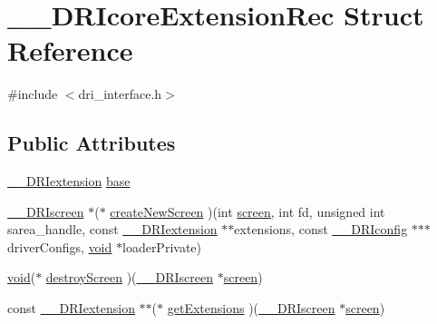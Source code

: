 \hypertarget{struct_____d_r_icore_extension_rec}{}\section{\+\_\+\+\_\+\+D\+R\+Icore\+Extension\+Rec Struct Reference}
\label{struct_____d_r_icore_extension_rec}


{\ttfamily \#include $<$dri\+\_\+interface.\+h$>$}

\subsection*{Public Attributes}
\begin{DoxyCompactItemize}
\item 
\hyperlink{dri__interface_8h_a4e0a61c8ece00d2b2c6792a9a1b55385}{\+\_\+\+\_\+\+D\+R\+Iextension} \hyperlink{struct_____d_r_icore_extension_rec_a5f960f7c4747dbda8574a66c246f2cc0}{base}
\item 
\hyperlink{dri__interface_8h_a9961b01d421ee1fd6ed3c05acc9ca561}{\+\_\+\+\_\+\+D\+R\+Iscreen} $\ast$($\ast$ \hyperlink{struct_____d_r_icore_extension_rec_ac1f7443c2b0244968dffeb347ee32fcb}{create\+New\+Screen} )(int \hyperlink{cad_8h_ae04e09e4e3831bfc1632c509ae37dcec}{screen}, int fd, unsigned int sarea\+\_\+handle, const \hyperlink{dri__interface_8h_a4e0a61c8ece00d2b2c6792a9a1b55385}{\+\_\+\+\_\+\+D\+R\+Iextension} $\ast$$\ast$extensions, const \hyperlink{dri__interface_8h_aeac81999efbbf8b1d6886338e3ea24d9}{\+\_\+\+\_\+\+D\+R\+Iconfig} $\ast$$\ast$$\ast$driver\+Configs, \hyperlink{_s_d_l__opengles2__gl2ext_8h_ae5d8fa23ad07c48bb609509eae494c95}{void} $\ast$loader\+Private)
\item 
\hyperlink{_s_d_l__opengles2__gl2ext_8h_ae5d8fa23ad07c48bb609509eae494c95}{void}($\ast$ \hyperlink{struct_____d_r_icore_extension_rec_adcd287b6c4009b4d8e01bac36fb0f09b}{destroy\+Screen} )(\hyperlink{dri__interface_8h_a9961b01d421ee1fd6ed3c05acc9ca561}{\+\_\+\+\_\+\+D\+R\+Iscreen} $\ast$\hyperlink{cad_8h_ae04e09e4e3831bfc1632c509ae37dcec}{screen})
\item 
const \hyperlink{dri__interface_8h_a4e0a61c8ece00d2b2c6792a9a1b55385}{\+\_\+\+\_\+\+D\+R\+Iextension} $\ast$$\ast$($\ast$ \hyperlink{struct_____d_r_icore_extension_rec_a410e0cf43ceb7137f9cdacae1f9a7a41}{get\+Extensions} )(\hyperlink{dri__interface_8h_a9961b01d421ee1fd6ed3c05acc9ca561}{\+\_\+\+\_\+\+D\+R\+Iscreen} $\ast$\hyperlink{cad_8h_ae04e09e4e3831bfc1632c509ae37dcec}{screen})
\item 

\end{DoxyCompactItemize}
